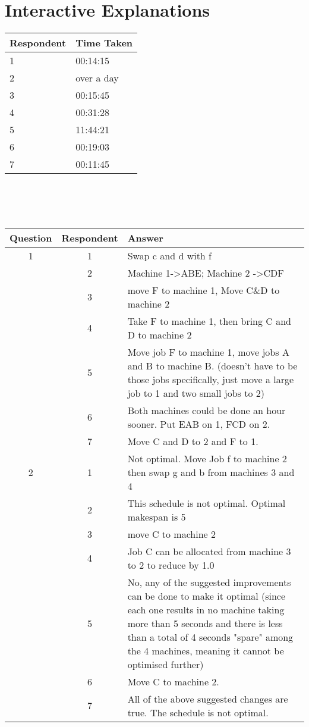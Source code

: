 \newpage
\section{Interactive Explanations}
\label{group3data}

\begin{tabular}{l l}
	\hline
	Respondent & Time Taken \\
	\hline
	1 & 00:14:15 \\
	2 & over a day \\
	3 & 00:15:45 \\
	4 & 00:31:28 \\
	5 & 11:44:21 \\
	6 & 00:19:03 \\
	7 & 00:11:45 \\
	\hline
\end{tabular}
\\\\\\
\begin{tabularx}{\linewidth}{c c X}
	Question & Respondent & Answer \\
	\hline
	1 & 1 & Swap c and d with f \\
	& 2 & Machine 1-\textgreater ABE; Machine 2 -\textgreater CDF \\
	& 3 & move F to machine 1, Move C\&D to machine 2 \\
	& 4 & Take F to machine 1, then bring C and D to machine 2 \\
	& 5 & Move job F to machine 1, move jobs A and B to machine B. (doesn't have to be those jobs specifically, just move a large job to 1 and two small jobs to 2) \\
	& 6 & Both machines could be done an hour sooner. Put EAB on 1, FCD on 2. \\
	& 7 & Move C and D to 2 and F to 1. \\
	\hline
	2 & 1 & Not optimal. Move Job f to machine 2 then swap g and b from machines 3 and 4 \\
	& 2 & This schedule is not optimal. Optimal makespan is 5 \\
	& 3 & move C to machine 2 \\
	& 4 & Job C can be allocated from machine 3 to 2 to reduce by 1.0 \\
	& 5 & No, any of the suggested improvements can be done to make it optimal (since each one results in no machine taking more than 5 seconds and there is less than a total of 4 seconds "spare" among the 4 machines, meaning it cannot be optimised further) \\
	& 6 & Move C to machine 2. \\
	& 7 & All of the above suggested changes are true. The schedule is not optimal. \\
	\hline
\end{tabularx}
